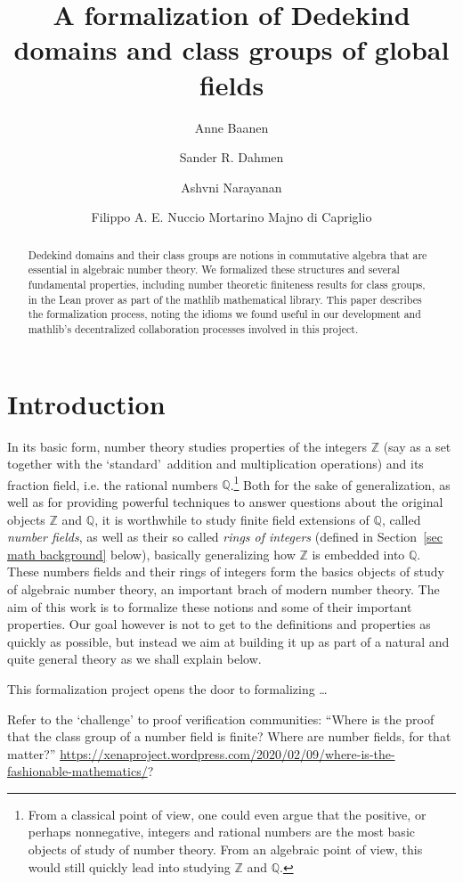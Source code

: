 \documentclass[a4paper,USenglish,cleveref, autoref, thm-restate]{lipics-v2021}
\title{A formalization of Dedekind domains and class groups of global fields}
\author{Anne Baanen}{Vrije Universiteit Amsterdam, Netherlands \and \url{https://cs.vu.nl/~tbn305}}{t.baanen@vu.nl}{https://orcid.org/0000-0001-8497-3683}
{NWO Vidi grant No. 016.Vidi.189.037, Lean Forward}
\author{Sander R. Dahmen}{Vrije Universiteit Amsterdam, Netherlands \and \url{https://few.vu.nl/~sdn249/}}{s.r.dahmen@vu.nl}{https://orcid.org/0000-0002-0014-0789}{NWO Vidi grant No. 639.032.613, New Diophantine Directions}
\author{Ashvni Narayanan}{affiliation? \and website?}{email}{orcID?}{funding?}
\author{Filippo A. E. Nuccio Mortarino Majno di Capriglio}{Univ Lyon, Université Jean Monnet Saint-Étienne, CNRS UMR 5208, Institut Camille Jordan\and\url {https://perso.univ-st-etienne.fr/nf51454h/index.html}}{filippo.nuccio@univ-st-etienne.fr}{https://orcid.org/0000-0002-5318-9869}{\empty}
\newcommand{\Q}{\mathbb{Q}}
\newcommand{\Z}{\mathbb{Z}}
\begin{document}
\maketitle

\begin{abstract}
Dedekind domains and their class groups are notions in commutative algebra that are essential in algebraic number theory.
We formalized these structures and several fundamental properties, including number theoretic finiteness results for class groups, in the Lean prover as part of the mathlib mathematical library.
This paper describes the formalization process,
noting the idioms we found useful in our development
and mathlib's decentralized collaboration processes involved in this project.
\end{abstract}

\section{Introduction}


In its basic form, number theory studies properties of the integers $\Z$ (say as a set together with the \lq standard\rq\ addition and multiplication operations) and its fraction field, i.e. the rational numbers $\Q$.\footnote{From a classical point of view, one could even argue that the positive, or perhaps nonnegative, integers and rational numbers are the most basic objects of study of number theory. From an algebraic point of view, this would still quickly lead into studying $\Z$ and $\Q$.}
Both for the sake of generalization, as well as for providing powerful techniques to answer questions about the original objects $\Z$ and $\Q$, it is worthwhile to study finite field extensions of $\Q$, called \emph{number fields}, as well as their so called \emph{rings of integers} (defined in Section~\ref{sec math background} below), basically generalizing how $\Z$ is embedded into $\Q$.
These numbers fields and their rings of integers form the basics objects of study of algebraic number theory, an important brach of modern number theory. 
The aim of this work is to formalize these notions and some of their important properties. Our goal however is not to get to the definitions and properties as quickly as 
possible, but instead we aim at building it up as part of a natural and quite general theory as we shall explain below.

This formalization project opens the door to formalizing \ldots

Refer to the `challenge' to proof verification communities: ``Where is the proof that the class group of a number field is finite? Where are number fields, for that matter?'' \url{https://xenaproject.wordpress.com/2020/02/09/where-is-the-fashionable-mathematics/}?
\end{document}
